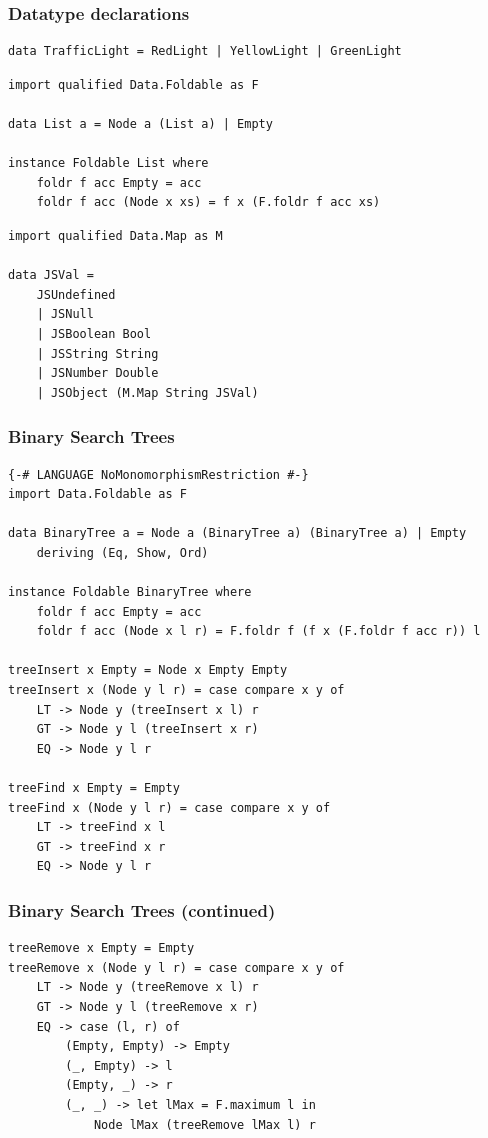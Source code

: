 \documentclass{beamer}
\begin{document}
\begin{frame}[fragile]
\frametitle{Datatype declarations}
\begin{Verbatim}[frame=single, fontsize=\scriptsize]
data TrafficLight = RedLight | YellowLight | GreenLight
\end{Verbatim}
\begin{Verbatim}[frame=single, fontsize=\scriptsize]
import qualified Data.Foldable as F

data List a = Node a (List a) | Empty

instance Foldable List where
    foldr f acc Empty = acc
    foldr f acc (Node x xs) = f x (F.foldr f acc xs)
\end{Verbatim}
\begin{Verbatim}[frame=single, fontsize=\scriptsize]
import qualified Data.Map as M

data JSVal =
    JSUndefined
    | JSNull
    | JSBoolean Bool
    | JSString String
    | JSNumber Double
    | JSObject (M.Map String JSVal)
\end{Verbatim}
\end{frame}

\begin{frame}[fragile]
\frametitle{Binary Search Trees}
\begin{Verbatim}[frame=single, fontsize=\scriptsize]
{-# LANGUAGE NoMonomorphismRestriction #-}
import Data.Foldable as F

data BinaryTree a = Node a (BinaryTree a) (BinaryTree a) | Empty
    deriving (Eq, Show, Ord)

instance Foldable BinaryTree where
    foldr f acc Empty = acc
    foldr f acc (Node x l r) = F.foldr f (f x (F.foldr f acc r)) l

treeInsert x Empty = Node x Empty Empty
treeInsert x (Node y l r) = case compare x y of
    LT -> Node y (treeInsert x l) r
    GT -> Node y l (treeInsert x r)
    EQ -> Node y l r

treeFind x Empty = Empty
treeFind x (Node y l r) = case compare x y of
    LT -> treeFind x l
    GT -> treeFind x r
    EQ -> Node y l r
\end{Verbatim}
\end{frame}

\begin{frame}[fragile]
\frametitle{Binary Search Trees (continued)}
\begin{Verbatim}[frame=single, fontsize=\scriptsize]
treeRemove x Empty = Empty
treeRemove x (Node y l r) = case compare x y of
    LT -> Node y (treeRemove x l) r
    GT -> Node y l (treeRemove x r)
    EQ -> case (l, r) of
        (Empty, Empty) -> Empty
        (_, Empty) -> l
        (Empty, _) -> r
        (_, _) -> let lMax = F.maximum l in
            Node lMax (treeRemove lMax l) r 
\end{Verbatim}
\end{frame}
\end{document}
